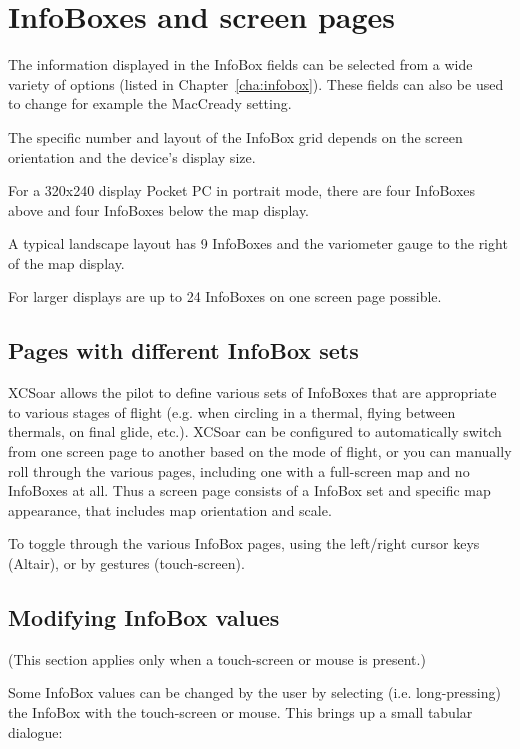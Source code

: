 \section{InfoBoxes and screen pages}

The information displayed in the InfoBox fields can be selected from a
wide variety of options (listed in Chapter~\ref{cha:infobox}). These
fields can also be used to change for example the MacCready setting.

The specific number and layout of the InfoBox grid depends on the
screen orientation and the device's display size.  

For a 320x240 display
Pocket PC in portrait mode, there are four InfoBoxes above and four
InfoBoxes below the map display.  

A typical landscape layout has 9 InfoBoxes and the variometer gauge 
to the right of the map display. 
 
For larger displays are up to 24 InfoBoxes on one screen page possible.

\subsection*{Pages with different InfoBox sets}

XCSoar allows the pilot to define various sets of InfoBoxes that are appropriate to various stages of flight (e.g. when circling in a thermal, flying between thermals, on final glide, etc.). XCSoar can be configured to automatically switch from one screen page to another based on the mode of flight, or you can manually roll through the various pages, including one with a full-screen map and no InfoBoxes at all. Thus a screen page consists of a InfoBox set and specific map appearance, that includes map orientation and scale.

To toggle through the various InfoBox pages, using the left/right cursor keys (Altair), or by gestures (touch-screen).


\subsection*{Modifying InfoBox values}
(This section applies only when a touch-screen or mouse is present.)

Some InfoBox values can be changed by the user by selecting (i.e. long-pressing) the
InfoBox with the touch-screen or mouse.  This brings up a small tabular dialogue:

